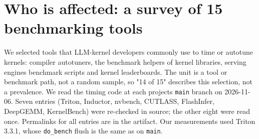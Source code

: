 \documentclass[11pt,a4paper]{article}
\begin{document}
\section{Who is affected: a survey of 15 benchmarking tools}\label{who-is-affected-a-survey-of-15-benchmarking-tools}

We selected tools that LLM-kernel developers commonly use to time or autotune kernels: compiler autotuners, the
benchmark helpers of kernel libraries, serving engines\textquotesingle{} benchmark scripts and kernel leaderboards. The unit is a tool
or benchmark path, not a random sample, so "14 of 15" describes this selection, not a prevalence. We read the timing
code at each project\textquotesingle s \texttt{main} branch on 2026-11-06. Seven entries (Triton,
Inductor, nvbench, CUTLASS, FlashInfer, DeepGEMM, KernelBench) were re-checked in source; the other eight were read
once. Permalinks for all entries are in the artifact. Our measurements used Triton 3.3.1, whose \texttt{do\_\allowbreak{}bench} flush is
the same as on \texttt{main}.
\end{document}

